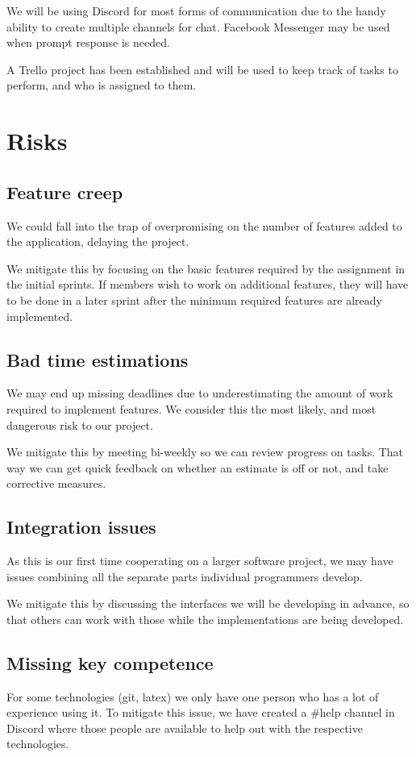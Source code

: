 \documentclass{article}
\begin{document}
We will be using Discord for most forms of communication due to the handy ability to create multiple channels for chat. Facebook Messenger may be used when prompt response is needed.

A Trello project has been established and will be used to keep track of tasks to perform, and who is assigned to them.

\section*{Risks}

\subsection*{Feature creep}

We could fall into the trap of overpromising on the number of features added to the application, delaying the project.

We mitigate this by focusing on the basic features required by the assignment in the initial sprints. If members wish to work on additional features, they will have to be done in a later sprint after the minimum required features are already implemented.

\subsection*{Bad time estimations}

We may end up missing deadlines due to underestimating the amount of work required to implement features. We consider this the most likely, and most dangerous risk to our project.

We mitigate this by meeting bi-weekly so we can review progress on tasks. That way we can get quick feedback on whether an estimate is off or not, and take corrective measures.

\subsection*{Integration issues}

As this is our first time cooperating on a larger software project, we may have issues combining all the separate parts individual programmers develop.

We mitigate this by discussing the interfaces we will be developing in advance, so that others can work with those while the implementations are being developed.

\subsection*{Missing key competence}

For some technologies (git, latex) we only have one person who has a lot of experience using it. To mitigate this issue, we have created a \#help channel in Discord where those people are available to help out with the respective technologies.
\end{document}
